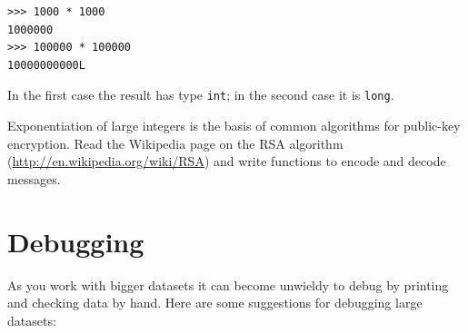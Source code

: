 \documentclass[10pt]{book}
\begin{document}
\begin{verbatim}
>>> 1000 * 1000
1000000
>>> 100000 * 100000
10000000000L
\end{verbatim}
%
In the first case the result has type {\tt int}; in the
second case it is {\tt long}.

\begin{exercise}

Exponentiation of large integers is the basis of common
algorithms for public-key encryption.  Read the Wikipedia
page on the RSA algorithm (\url{http://en.wikipedia.org/wiki/RSA})
and write functions to encode and decode messages.


\end{exercise}


\section{Debugging}

As you work with bigger datasets it can become unwieldy to
debug by printing and checking data by hand.  Here are some
suggestions for debugging large datasets:
\end{document}
